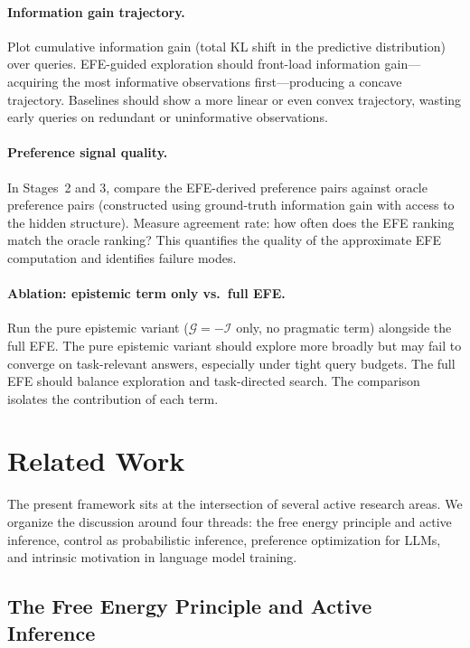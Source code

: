 \documentclass[11pt]{article}
\newcommand{\EFE}{\mathcal{G}}
\begin{document}
\paragraph{Information gain trajectory.}
Plot cumulative information gain (total KL shift in the predictive distribution) over queries. EFE-guided exploration should front-load information gain---acquiring the most informative observations first---producing a concave trajectory. Baselines should show a more linear or even convex trajectory, wasting early queries on redundant or uninformative observations.

\paragraph{Preference signal quality.}
In Stages~2 and 3, compare the EFE-derived preference pairs against oracle preference pairs (constructed using ground-truth information gain with access to the hidden structure). Measure agreement rate: how often does the EFE ranking match the oracle ranking? This quantifies the quality of the approximate EFE computation and identifies failure modes.

\paragraph{Ablation: epistemic term only vs.\ full EFE.}
Run the pure epistemic variant ($\EFE = -\mathcal{I}$ only, no pragmatic term) alongside the full EFE. The pure epistemic variant should explore more broadly but may fail to converge on task-relevant answers, especially under tight query budgets. The full EFE should balance exploration and task-directed search. The comparison isolates the contribution of each term.


\section{Related Work}
\label{sec:related}

The present framework sits at the intersection of several active research areas. We organize the discussion around four threads: the free energy principle and active inference, control as probabilistic inference, preference optimization for LLMs, and intrinsic motivation in language model training.

\subsection{The Free Energy Principle and Active Inference}
\end{document}
